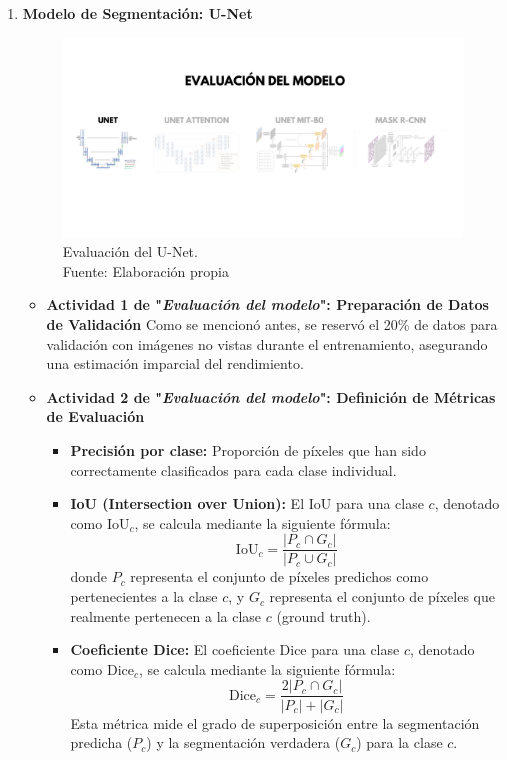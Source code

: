 \begin{enumerate}
  \item \textbf{Modelo de Segmentación: U-Net}
  \begin{figure}[H]
	\begin{center}
		\includegraphics[width=1\textwidth]{4/figures/evunet.png}
		\caption[Evaluación del U-Net]{Evaluación del U-Net.\\
		Fuente: Elaboración propia}
		\label{4:figevunet}
	\end{center}
\end{figure}

  \begin{itemize}
  \item\textbf{Actividad 1 de "\textit{Evaluación del modelo}": Preparación de Datos de Validación}
  Como se mencionó antes, se reservó el 20\% de datos para validación con imágenes no vistas durante el entrenamiento, asegurando una estimación imparcial del rendimiento.
  
  \item\textbf{Actividad 2 de "\textit{Evaluación del modelo}": Definición de Métricas de Evaluación}
  \begin{itemize}
  \item \textbf{Precisión por clase:} Proporción de píxeles que han sido correctamente clasificados para cada clase individual.

  \item \textbf{IoU (Intersection over Union):} El IoU para una clase $c$, denotado como $\text{IoU}_c$, se calcula mediante la siguiente fórmula:
$$\text{IoU}_c = \frac{|P_c \cap G_c|}{|P_c \cup G_c|}$$
donde $P_c$ representa el conjunto de píxeles predichos como pertenecientes a la clase $c$, y $G_c$ representa el conjunto de píxeles que realmente pertenecen a la clase $c$ (ground truth).

  \item \textbf{Coeficiente Dice:} El coeficiente Dice para una clase $c$, denotado como $\text{Dice}_c$, se calcula mediante la siguiente fórmula:
$$\text{Dice}_c = \frac{2|P_c \cap G_c|}{|P_c| + |G_c|}$$
Esta métrica mide el grado de superposición entre la segmentación predicha ($P_c$) y la segmentación verdadera ($G_c$) para la clase $c$.
 


\end{itemize}
\end{itemize}
\end{enumerate}
